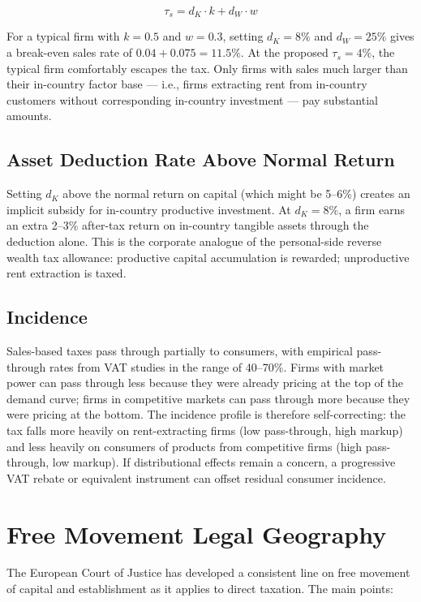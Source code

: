 \documentclass[11pt,a4paper]{article}
\begin{document}
\[
\tau_s = d_K \cdot k + d_W \cdot w
\]

For a typical firm with $k = 0.5$ and $w = 0.3$, setting $d_K = 8\%$ and $d_W = 25\%$ gives a break-even sales rate of $0.04 + 0.075 = 11.5\%$. At the proposed $\tau_s = 4\%$, the typical firm comfortably escapes the tax. Only firms with sales much larger than their in-country factor base — i.e., firms extracting rent from in-country customers without corresponding in-country investment — pay substantial amounts.

\subsection{Asset Deduction Rate Above Normal Return}

Setting $d_K$ above the normal return on capital (which might be 5--6\%) creates an implicit subsidy for in-country productive investment. At $d_K = 8\%$, a firm earns an extra 2--3\% after-tax return on in-country tangible assets through the deduction alone. This is the corporate analogue of the personal-side reverse wealth tax allowance: productive capital accumulation is rewarded; unproductive rent extraction is taxed.

\subsection{Incidence}

Sales-based taxes pass through partially to consumers, with empirical pass-through rates from VAT studies in the range of 40--70\%. Firms with market power can pass through less because they were already pricing at the top of the demand curve; firms in competitive markets can pass through more because they were pricing at the bottom. The incidence profile is therefore self-correcting: the tax falls more heavily on rent-extracting firms (low pass-through, high markup) and less heavily on consumers of products from competitive firms (high pass-through, low markup). If distributional effects remain a concern, a progressive VAT rebate or equivalent instrument can offset residual consumer incidence.

\section{Free Movement Legal Geography}

The European Court of Justice has developed a consistent line on free movement of capital and establishment as it applies to direct taxation. The main points:
\end{document}
